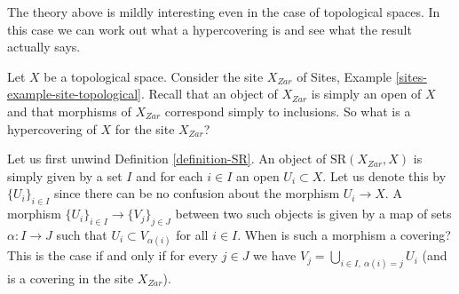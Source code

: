 \documentclass{stacks-project}
\theoremstyle{plain}
\theoremstyle{definition}
\theoremstyle{remark}
\numberwithin{equation}{subsection}
\begin{document}
\noindent
The theory above is mildly interesting even in the case of topological
spaces. In this case we can work out what a hypercovering is and see
what the result actually says.

\medskip\noindent
Let $X$ be a topological space. Consider the site $X_{Zar}$
of Sites, Example \ref{sites-example-site-topological}. Recall that
an object of $X_{Zar}$ is simply an open of $X$ and that morphisms
of $X_{Zar}$ correspond simply to inclusions. So what is a
hypercovering of $X$ for the site $X_{Zar}$?

\medskip\noindent
Let us first unwind Definition \ref{definition-SR}.
An object of $\text{SR}(X_{Zar}, X)$ is simply given by a set
$I$ and for each $i \in I$ an open $U_i \subset X$.
Let us denote this by $\{U_i\}_{i \in I}$ since there can be no
confusion about the morphism $U_i \to X$.
A morphism $\{U_i\}_{i \in I} \to \{V_j\}_{j \in J}$
between two such objects is given by a map of sets
$\alpha : I \to J$ such that $U_i \subset V_{\alpha(i)}$ for all
$i \in I$. When is such a morphism a covering? This is the case
if and only if for every $j \in J$ we have
$V_j = \bigcup_{i\in I, \ \alpha(i) = j} U_i$ (and is
a covering in the site $X_{Zar}$).
\end{document}
